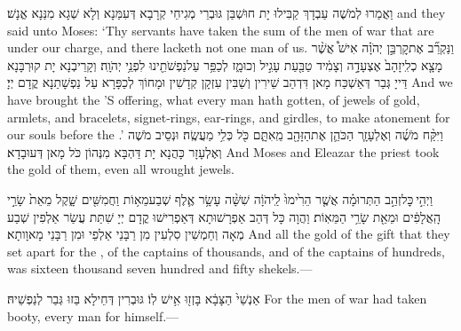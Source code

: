 {וַאֲמַרוּ לְמֹשֶׁה עַבְדָךְ קַבִּילוּ יָת חוּשְׁבַּן גּוּבְרֵי מְגִיחֵי קְרָבָא דְּעִמַּנָא וְלָא שְׁגָא מִנַּנָא אֱנָשׁ׃}
{and they said unto Moses: ‘Thy servants have taken the sum of the men of war that are under our charge, and there lacketh not one man of us.}{}
{וַנַּקְרֵ֞ב אֶת\maqqaf קׇרְבַּ֣ן יְהֹוָ֗ה אִישׁ֩ אֲשֶׁ֨ר מָצָ֤א כְלִֽי\maqqaf זָהָב֙ אֶצְעָדָ֣ה וְצָמִ֔יד טַבַּ֖עַת עָגִ֣יל וְכוּמָ֑ז לְכַפֵּ֥ר עַל\maqqaf נַפְשֹׁתֵ֖ינוּ לִפְנֵ֥י יְהֹוָֽה׃}
{וְקָרֵיבְנָא יָת קוּרְבָּנָא דַּייָ גְּבַר דְּאַשְׁכַּח מָאן דִּדְהַב שֵׁירִין וְשַׁבִּין עִזְקָן קְדָשִׁין וּמָחוֹךְ לְכַפָּרָא עַל נַפְשָׁתַנָא קֳדָם יְיָ׃}
{And we have brought the \lord’S offering, what every man hath gotten, of jewels of gold, armlets, and bracelets, signet-rings, ear-rings, and girdles, to make atonement for our souls before the \lord.’}{}
{וַיִּקַּ֨ח מֹשֶׁ֜ה וְאֶלְעָזָ֧ר הַכֹּהֵ֛ן אֶת\maqqaf הַזָּהָ֖ב מֵֽאִתָּ֑ם כֹּ֖ל כְּלִ֥י מַעֲשֶֽׂה׃}
{וּנְסֵיב מֹשֶׁה וְאֶלְעָזָר כָּהֲנָא יָת דַּהְבָּא מִנְּהוֹן כֹּל מָאן דְּעוּבָדָא׃}
{And Moses and Eleazar the priest took the gold of them, even all wrought jewels.}{}

{וַיְהִ֣י \legarmeh  כׇּל\maqqaf זְהַ֣ב הַתְּרוּמָ֗ה אֲשֶׁ֤ר הֵרִ֙ימוּ֙ לַֽיהֹוָ֔ה שִׁשָּׁ֨ה עָשָׂ֥ר אֶ֛לֶף שְׁבַע\maqqaf מֵא֥וֹת וַחֲמִשִּׁ֖ים שָׁ֑קֶל מֵאֵת֙ שָׂרֵ֣י הָֽאֲלָפִ֔ים וּמֵאֵ֖ת שָׂרֵ֥י הַמֵּאֽוֹת׃}
{וַהֲוָה כָּל דְּהַב אַפְרָשׁוּתָא דְּאַפְרִישׁוּ קֳדָם יְיָ שִׁתַּת עֲשַׂר אַלְפִין שְׁבַע מְאָה וְחַמְשִׁין סִלְעִין מִן רַבָּנֵי אַלְפֵי וּמִן רַבָּנֵי מָאוָותָא׃}
{And all the gold of the gift that they set apart for the \lord, of the captains of thousands, and of the captains of hundreds, was sixteen thousand seven hundred and fifty shekels.—}{}

{אַנְשֵׁי֙ הַצָּבָ֔א בָּזְז֖וּ אִ֥ישׁ לֽוֹ׃}
{גּוּבְרִין דְּחֵילָא בַּזוּ גְּבַר לְנַפְשֵׁיהּ׃}
{For the men of war had taken booty, every man for himself.—}{}

